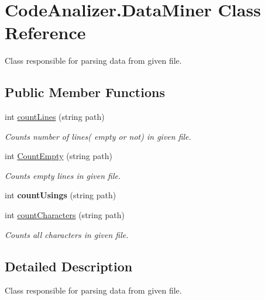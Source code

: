 \hypertarget{class_code_analizer_1_1_data_miner}{}\section{Code\+Analizer.\+Data\+Miner Class Reference}
\label{class_code_analizer_1_1_data_miner}


Class responsible for parsing data from given file.  


\subsection*{Public Member Functions}
\begin{DoxyCompactItemize}
\item 
int \mbox{\hyperlink{class_code_analizer_1_1_data_miner_a40b1994ce7b6fdc90cf40c443d7fb503}{count\+Lines}} (string path)
\begin{DoxyCompactList}\small\item\em Counts number of lines( empty or not) in given file. \end{DoxyCompactList}\item 
int \mbox{\hyperlink{class_code_analizer_1_1_data_miner_a5071efa31874229befaefa1ec5f4dfcb}{Count\+Empty}} (string path)
\begin{DoxyCompactList}\small\item\em Counts empty lines in given file. \end{DoxyCompactList}\item 
\mbox{\label{class_code_analizer_1_1_data_miner_a57aa4bb612d960dde02b9fc9e828ac31}} 
int {\bfseries count\+Usings} (string path)
\item 
int \mbox{\hyperlink{class_code_analizer_1_1_data_miner_ad12c71980401c62499f06c7417a1e59c}{count\+Characters}} (string path)
\begin{DoxyCompactList}\small\item\em Counts all characters in given file. \end{DoxyCompactList}\end{DoxyCompactItemize}


\subsection{Detailed Description}
Class responsible for parsing data from given file. 



